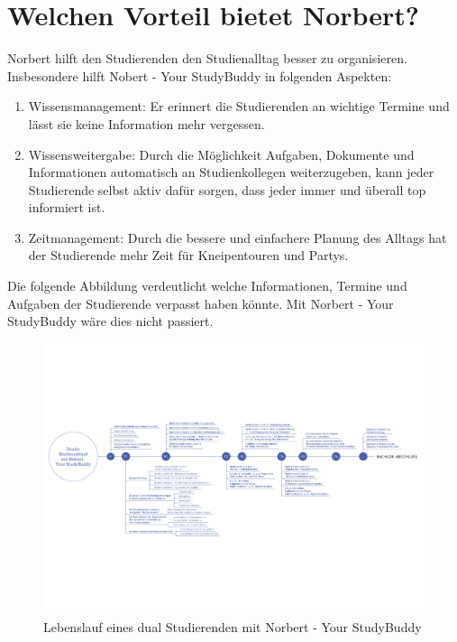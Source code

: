 \section{Welchen Vorteil bietet Norbert?}
Norbert hilft den Studierenden den Studienalltag besser zu organisieren. Insbesondere hilft Nobert - Your StudyBuddy in folgenden Aspekten:
\begin{enumerate}
	\item Wissensmanagement: Er erinnert die Studierenden an wichtige Termine und lässt sie keine Information mehr vergessen.
	\item Wissensweitergabe: Durch die Möglichkeit Aufgaben, Dokumente und Informationen automatisch an Studienkollegen weiterzugeben, kann jeder Studierende selbst aktiv dafür sorgen, dass jeder immer und überall top informiert ist.
	\item Zeitmanagement: Durch die bessere und einfachere Planung des Alltags hat der Studierende mehr Zeit für Kneipentouren und Partys.	
\end{enumerate}

Die folgende Abbildung verdeutlicht welche Informationen, Termine und Aufgaben der Studierende verpasst haben könnte. Mit Norbert - Your StudyBuddy wäre dies nicht passiert.

\newpage
\begin{landscape}
\vspace*{35mm}
	\begin{figure}[H]
	\centering
	\includegraphics[scale=0.75]{images/timeline.pdf}
	\caption{Lebenslauf eines dual Studierenden mit Norbert - Your StudyBuddy}
	\end{figure}
	
\end{landscape}
\newpage

